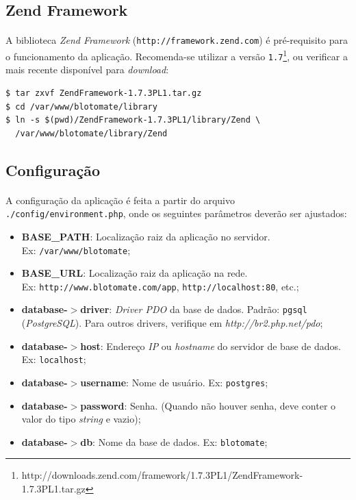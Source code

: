 \documentclass[a4paper,12pt]{article}
\begin{document}
\subsection{Zend Framework}

\paragraph{}
A biblioteca \emph{Zend Framework} (\texttt{http://framework.zend.com}) é
pré-requisito para o funcionamento da aplicação. Recomenda-se utilizar a versão
\texttt{1.7}\footnote{http://downloads.zend.com/framework/1.7.3PL1/ZendFramework-1.7.3PL1.tar.gz},
ou verificar a mais recente disponível para \emph{download}:

\begin{verbatim}
$ tar zxvf ZendFramework-1.7.3PL1.tar.gz
$ cd /var/www/blotomate/library
$ ln -s $(pwd)/ZendFramework-1.7.3PL1/library/Zend \
  /var/www/blotomate/library/Zend
\end{verbatim}

\subsection{Configuração}

\paragraph{}
A configuração da aplicação é feita a partir do arquivo
\texttt{./config/environment.php}, onde os seguintes parâmetros deverão ser
ajustados:

\begin{itemize}
\item \textbf{BASE\_PATH}: Localização raiz da aplicação no servidor. \\
Ex: \texttt{/var/www/blotomate};
\item \textbf{BASE\_URL}: Localização raiz da aplicação na rede. \\ 
Ex: \texttt{http://www.blotomate.com/app}, \texttt{http://localhost:80}, etc.;
\item \textbf{database-$>$driver}: \emph{Driver PDO} da base de dados. Padrão:
\texttt{pgsql} (\emph{PostgreSQL}). Para outros drivers, verifique em
\emph{http://br2.php.net/pdo};
\item \textbf{database-$>$host}: Endereço \emph{IP} ou \emph{hostname} do
servidor de base de dados. Ex: \texttt{localhost};
\item \textbf{database-$>$username}: Nome de usuário. Ex: \texttt{postgres};
\item \textbf{database-$>$password}: Senha. (Quando não houver senha, deve
conter o valor do tipo \emph{string} e vazio);
\item \textbf{database-$>$db}: Nome da base de dados. Ex: \texttt{blotomate};
\end{itemize}
\end{document}
